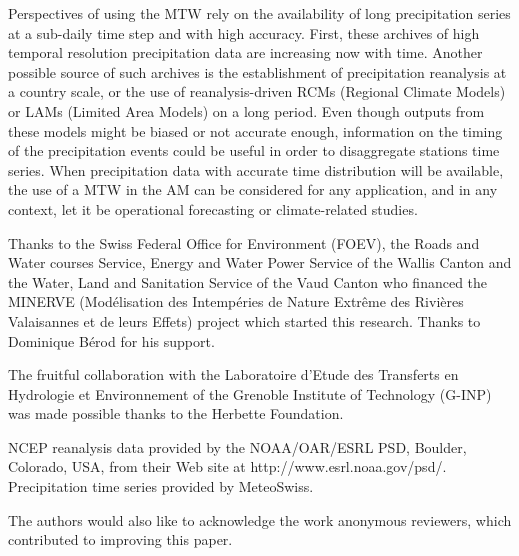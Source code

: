 \documentclass[hess, manuscript]{copernicus}
\begin{document}
Perspectives of using the MTW rely on the availability of long precipitation series at a sub-daily time step and with high accuracy. First, these archives of high temporal resolution precipitation data are increasing now with time. Another possible source of such archives is the establishment of precipitation reanalysis at a country scale, or the use of reanalysis-driven RCMs (Regional Climate Models) or LAMs (Limited Area Models) on a long period. Even though outputs from these models might be biased or not accurate enough, information on the timing of the precipitation events could be useful in order to disaggregate stations time series. When precipitation data with accurate time distribution will be available, the use of a MTW in the AM can be considered for any application, and in any context, let it be operational forecasting or climate-related studies.



\begin{acknowledgements}
Thanks to the Swiss Federal Office for Environment (FOEV), the Roads and Water courses Service, Energy and Water Power Service of the Wallis Canton and the Water, Land and Sanitation Service of the Vaud Canton who financed the MINERVE (Mod\'{e}lisation des Intemp\'{e}ries de Nature Extr\^{e}me des Rivi\`{e}res Valaisannes et de leurs Effets) project which started this research. Thanks to Dominique B\'{e}rod for his support.

The fruitful collaboration with the Laboratoire d'Etude des Transferts en Hydrologie et Environnement of the Grenoble Institute of Technology (G-INP) was made possible thanks to the Herbette Foundation. 

NCEP reanalysis data provided by the NOAA/OAR/ESRL PSD, Boulder, Colorado, USA, from their Web site at http://www.esrl.noaa.gov/psd/. Precipitation time series provided by MeteoSwiss.

The authors would also like to acknowledge the work anonymous reviewers, which contributed to improving this paper. 
\end{acknowledgements}






\end{document}
